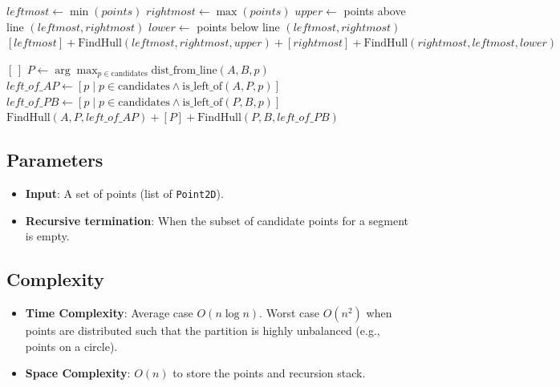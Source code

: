 \begin{algorithm}[htbp]
\caption{QuickHull Algorithm}
\label{alg:quickhull}
\begin{algorithmic}[1]
  \State $leftmost \gets \min(points)$
  \State $rightmost \gets \max(points)$
  \State $upper \gets$ points above line $(leftmost, rightmost)$
  \State $lower \gets$ points below line $(leftmost, rightmost)$
  \State \Return $[leftmost] + \text{FindHull}(leftmost, rightmost, upper) + [rightmost] + \text{FindHull}(rightmost, leftmost, lower)$
\EndFunction

    \State \Return $[\,]$
  \EndIf
  \State $P \gets \arg\max_{p \in \text{candidates}} \text{dist\_from\_line}(A, B, p)$
  \State $left\_of\_AP \gets [p \mid p \in \text{candidates} \wedge \text{is\_left\_of}(A, P, p)]$
  \State $left\_of\_PB \gets [p \mid p \in \text{candidates} \wedge \text{is\_left\_of}(P, B, p)]$
  \State \Return $\text{FindHull}(A, P, left\_of\_AP) + [P] + \text{FindHull}(P, B, left\_of\_PB)$
\EndFunction
\end{algorithmic}
\end{algorithm}

\subsection{Parameters}

\begin{itemize}
\item \textbf{Input}: A set of points (list of \texttt{Point2D}).
\item \textbf{Recursive termination}: When the subset of candidate points for a segment is empty.
\end{itemize}

\subsection{Complexity}

\begin{itemize}
\item \textbf{Time Complexity}: Average case $O(n \log n)$. Worst case $O(n^2)$ when points are distributed such that the partition is highly unbalanced (e.g., points on a circle).
\item \textbf{Space Complexity}: $O(n)$ to store the points and recursion stack.
\end{itemize}

